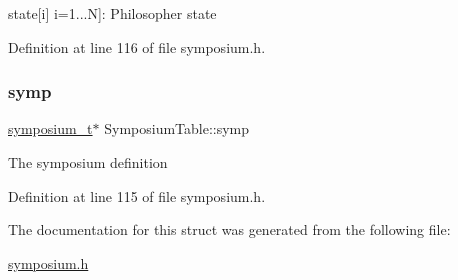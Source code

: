 state\mbox{[}i\mbox{]} i=1...N\mbox{]}\+: Philosopher state 

Definition at line 116 of file symposium.\+h.

\mbox{\label{structSymposiumTable_a4089e2778ba23eb79c4785eb5702f70f}} 
\subsubsection{\texorpdfstring{symp}{symp}}
{\footnotesize\ttfamily \hyperlink{structsymposium__t}{symposium\+\_\+t}$\ast$ Symposium\+Table\+::symp}

The symposium definition 

Definition at line 115 of file symposium.\+h.



The documentation for this struct was generated from the following file\+:\begin{DoxyCompactItemize}
\item 
\hyperlink{symposium_8h}{symposium.\+h}\end{DoxyCompactItemize}
